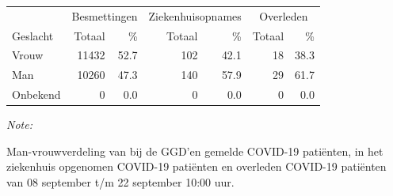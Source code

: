 \documentclass[
  english,
  man,floatsintext]{apa6}
\begin{document}
\begin{table}[H]
\centering\begingroup\fontsize{11}{13}\selectfont

\begin{threeparttable}
\begin{tabular}{lrrrrrr}
\toprule
\multicolumn{1}{c}{ } & \multicolumn{2}{c}{Besmettingen} & \multicolumn{2}{c}{Ziekenhuisopnames} & \multicolumn{2}{c}{Overleden} \\
\cmidrule(l{3pt}r{3pt}){2-3} \cmidrule(l{3pt}r{3pt}){4-5} \cmidrule(l{3pt}r{3pt}){6-7}
Geslacht & Totaal & \% & Totaal & \% & Totaal & \%\\
\midrule
Vrouw & 11432 & 52.7 & 102 & 42.1 & 18 & 38.3\\
Man & 10260 & 47.3 & 140 & 57.9 & 29 & 61.7\\
Onbekend & 0 & 0.0 & 0 & 0.0 & 0 & 0.0\\
\bottomrule
\end{tabular}
\begin{tablenotes}
\item \textit{Note: } 
\item Man-vrouwverdeling van bij de GGD’en gemelde COVID-19 patiënten, in het ziekenhuis opgenomen COVID-19 patiënten en overleden COVID-19 patiënten van 08 september t/m 22 september 10:00 uur.
\end{tablenotes}
\end{threeparttable}
\endgroup{}
\end{table}
\newpage
\end{document}
